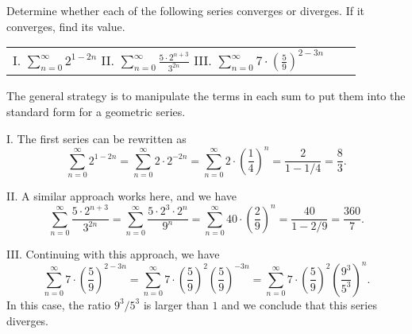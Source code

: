 \documentclass[noauthor, handout]{ximera}
\begin{document}

\begin{problem}
Determine whether each of the following series converges or diverges. If it converges, find its value.
\begin{center}
\begin{tabular}{lll}
I. $\sum_{n=0}^\infty 2^{1-2n}$ \hspace{.5in} II. $\sum_{n=0}^\infty \frac{5 \cdot 2^{n+3}}{3^{2n}}$ \hspace{.5in} III. $\sum_{n=0}^\infty 7 \cdot \left(\frac{5}{9}\right)^{2-3n}$ \hspace{.2in} %
\end{tabular}
\end{center}
\end{problem}

\begin{freeResponse}
The general strategy is to manipulate the terms in each sum to put them into the standard form for a geometric series.

I. The first series can be rewritten as 
$$
\sum_{n=0}^\infty 2^{1-2n} = \sum_{n=0}^\infty 2 \cdot 2^{-2n} = \sum_{n=0}^\infty 2 \cdot \left(\frac{1}{4}\right)^n = \frac{2}{1-1/4} = \frac{8}{3}.
$$

II. A similar approach works here, and we have
$$
\sum_{n=0}^\infty \frac{5 \cdot 2^{n+3}}{3^{2n}} = \sum_{n=0}^\infty \frac{5 \cdot 2^3 \cdot 2^n}{9^n} = \sum_{n=0}^\infty 40 \cdot \left(\frac{2}{9}\right)^n = \frac{40}{1-2/9} = \frac{360}{7}.
$$

III. Continuing with this approach, we have
$$
\sum_{n=0}^\infty 7 \cdot \left(\frac{5}{9}\right)^{2-3n} = \sum_{n=0}^\infty 7 \cdot \left(\frac{5}{9}\right)^2 \left(\frac{5}{9}\right)^{-3n} = \sum_{n=0}^\infty 7 \cdot \left(\frac{5}{9}\right)^2 \left(\frac{9^3}{5^3}\right)^{n}.
$$
In this case, the ratio $9^3/5^3$ is larger than $1$ and we conclude that this series diverges.

\end{freeResponse}
\end{document}

